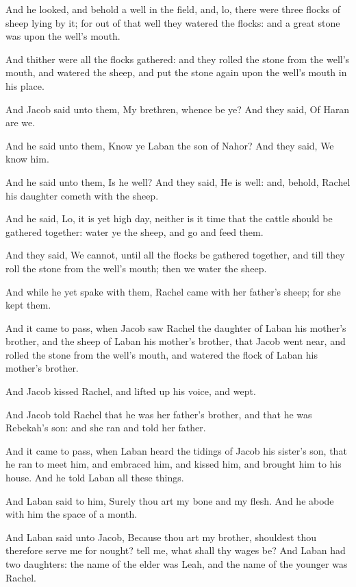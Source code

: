 \verse And he looked, and behold a well in the field, and, lo, there were three flocks of sheep lying by it; for out of that well they watered the flocks: and a great stone was upon the well's mouth.

\verse And thither were all the flocks gathered: and they rolled the stone from the well's mouth, and watered the sheep, and put the stone again upon the well's mouth in his place.

\verse And Jacob said unto them, My brethren, whence be ye? And they said, Of Haran are we.

\verse And he said unto them, Know ye Laban the son of Nahor? And they said, We know him.

\verse And he said unto them, Is he well? And they said, He is well: and, behold, Rachel his daughter cometh with the sheep.

\verse And he said, Lo, it is yet high day, neither is it time that the cattle should be gathered together: water ye the sheep, and go and feed them.

\verse And they said, We cannot, until all the flocks be gathered together, and till they roll the stone from the well's mouth; then we water the sheep.

\verse And while he yet spake with them, Rachel came with her father's sheep; for she kept them.

\verse And it came to pass, when Jacob saw Rachel the daughter of Laban his mother's brother, and the sheep of Laban his mother's brother, that Jacob went near, and rolled the stone from the well's mouth, and watered the flock of Laban his mother's brother.

\verse And Jacob kissed Rachel, and lifted up his voice, and wept.

\verse And Jacob told Rachel that he was her father's brother, and that he was Rebekah's son: and she ran and told her father.

\verse And it came to pass, when Laban heard the tidings of Jacob his sister's son, that he ran to meet him, and embraced him, and kissed him, and brought him to his house. And he told Laban all these things.

\verse And Laban said to him, Surely thou art my bone and my flesh. And he abode with him the space of a month.

\verse And Laban said unto Jacob, Because thou art my brother, shouldest thou therefore serve me for nought? tell me, what shall thy wages be?  \verse And Laban had two daughters: the name of the elder was Leah, and the name of the younger was Rachel.

